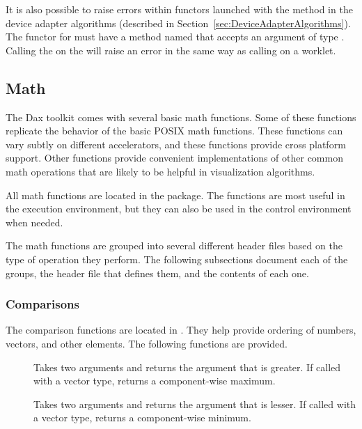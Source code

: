 It is also possible to raise errors within functors launched with the
 method in the device adapter algorithms (described in
Section~\ref{sec:DeviceAdapterAlgorithms}). The functor for
 must have a method named
 that accepts an argument of type
. Calling the  on
the  will raise an error in the same way
as calling  on a worklet.


\subsection{Math}
\label{sec:Math}


The Dax toolkit comes with several basic math functions. Some of these
functions replicate the behavior of the basic POSIX math functions. These
functions can vary subtly on different accelerators, and these functions
provide cross platform support. Other functions provide convenient
implementations of other common math operations that are likely to be
helpful in visualization algorithms.

All math functions are located in the \daxmath{} package. The functions are
most useful in the execution environment, but they can also be used in the
control environment when needed.

The math functions are grouped into several different header files based on
the type of operation they perform. The following subsections document each
of the groups, the header file that defines them, and the contents of each
one.

\subsubsection{Comparisons}

The comparison functions are located in
. They help provide ordering of numbers,
vectors, and other elements. The following functions are provided.

\begin{description}
\item[]  Takes two arguments and returns the
  argument that is greater. If called with a vector type, returns a
  component-wise maximum.
\item[]  Takes two arguments and returns the
  argument that is lesser. If called with a vector type, returns a
  component-wise minimum.
\end{description}

